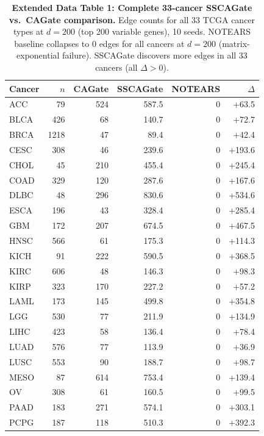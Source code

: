 \documentclass[12pt,a4paper]{article}
\begin{document}
\begin{table}[H]
\centering
\caption{\textbf{Extended Data Table 1: Complete 33-cancer SSCAGate vs.\ CAGate comparison.} Edge counts for all 33 TCGA cancer types at $d=200$ (top 200 variable genes), 10 seeds. NOTEARS baseline collapses to 0 edges for all cancers at $d=200$ (matrix-exponential failure). SSCAGate discovers more edges in all 33 cancers (all $\Delta > 0$).}
\label{tab:ed1}
\medskip
\footnotesize
\setlength{\tabcolsep}{5pt}
\begin{tabular}{lrrrrr}
\toprule
Cancer & $n$ & CAGate & SSCAGate & NOTEARS & $\Delta$ \\
\midrule
ACC  & 79  & 524 & 587.5 & 0 & +63.5 \\
BLCA & 426 & 68  & 140.7 & 0 & +72.7 \\
BRCA & 1218& 47  & 89.4  & 0 & +42.4 \\
CESC & 308 & 46  & 239.6 & 0 & +193.6 \\
CHOL & 45  & 210 & 455.4 & 0 & +245.4 \\
COAD & 329 & 120 & 287.6 & 0 & +167.6 \\
DLBC & 48  & 296 & 830.6 & 0 & +534.6 \\
ESCA & 196 & 43  & 328.4 & 0 & +285.4 \\
GBM  & 172 & 207 & 674.5 & 0 & +467.5 \\
HNSC & 566 & 61  & 175.3 & 0 & +114.3 \\
KICH & 91  & 222 & 590.5 & 0 & +368.5 \\
KIRC & 606 & 48  & 146.3 & 0 & +98.3 \\
KIRP & 323 & 170 & 227.2 & 0 & +57.2 \\
LAML & 173 & 145 & 499.8 & 0 & +354.8 \\
LGG  & 530 & 77  & 211.9 & 0 & +134.9 \\
LIHC & 423 & 58  & 136.4 & 0 & +78.4 \\
LUAD & 576 & 77  & 113.9 & 0 & +36.9 \\
LUSC & 553 & 90  & 188.7 & 0 & +98.7 \\
MESO & 87  & 614 & 753.4 & 0 & +139.4 \\
OV   & 308 & 61  & 160.5 & 0 & +99.5 \\
PAAD & 183 & 271 & 574.1 & 0 & +303.1 \\
PCPG & 187 & 118 & 510.3 & 0 & +392.3 \\

\end{tabular}
\end{table}
\end{document}
